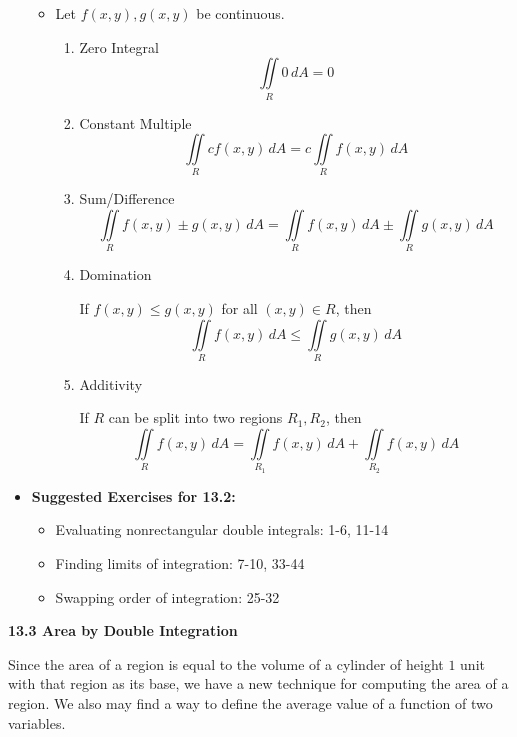 \documentclass[12pt]{article}
\theoremstyle{plain}
\theoremstyle{definition}
\theoremstyle{remark}
\begin{document}
\begin{itemize}
		\begin{itemize}
		\item Let $f(x,y),g(x,y)$ be continuous.
			\begin{enumerate}
			\item Zero Integral
				\[\iint\limits_R 0\,dA = 0\]
			\item Constant Multiple
				\[\iint\limits_R cf(x,y)\,dA = c\iint\limits_R f(x,y)\,dA\]
			\item Sum/Difference
				\[\iint\limits_R f(x,y)\pm g(x,y)\,dA=\iint\limits_R f(x,y)\,dA\pm\iint\limits_R g(x,y)\,dA\]
			\item Domination
			
			If $f(x,y)\leq g(x,y)$ for all $(x,y)\in R$, then
				\[\iint\limits_R f(x,y)\,dA \leq \iint\limits_R g(x,y)\,dA\]
			\item Additivity
			
			If $R$ can be split into two regions $R_1,R_2$, then
				\[\iint\limits_R f(x,y)\,dA = \iint\limits_{R_1} f(x,y)\,dA + \iint\limits_{R_2} f(x,y)\,dA\]
			\end{enumerate}
		\end{itemize}
		
	\item \textbf{Suggested Exercises for 13.2:}
	
		\begin{itemize}
		\item Evaluating nonrectangular double integrals: 1-6, 11-14
		\item Finding limits of integration: 7-10, 33-44
		\item Swapping order of integration: 25-32
		\end{itemize}
		
	\end{itemize}
	
	\newpage
	
	\centerline{\bf 13.3 Area by Double Integration}
	
	Since the area of a region is equal to the volume of a cylinder of height $1$ unit with that region as its base, we have a new technique for computing the area of a region. We also may find a way to define the average value of a function of two variables.
	
\end{document}
